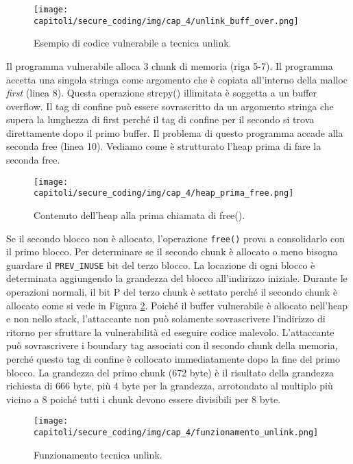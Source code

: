 \begin{figure}[H]
    \centering
    \texttt{[image: capitoli/secure\_coding/img/cap\_4/unlink\_buff\_over.png]}
    \caption{Esempio di codice vulnerabile a tecnica unlink.}\label{fig:ulink_buff_over}
\end{figure}

Il programma vulnerabile alloca 3 chunk di memoria (riga 5-7). Il programma accetta
una singola stringa come argomento che è copiata all'interno della malloc \textit{first} (linea 8).
Questa operazione strcpy() illimitata è soggetta a un buffer overflow.
Il tag di confine può essere sovrascritto da un argomento stringa che supera la
lunghezza di first perché il tag di confine per il secondo si trova direttamente dopo
il primo buffer. Il problema di questo programma accade alla seconda free (linea 10).
Vediamo come è strutturato l'heap prima di fare la seconda free.

\begin{figure}[H]
    \centering
    \texttt{[image: capitoli/secure\_coding/img/cap\_4/heap\_prima\_free.png]}
    \caption{Contenuto dell'heap alla prima chiamata di free().}\label{fig:heap_prima_free}
\end{figure}

\vspace{-1em}

Se il secondo blocco non è allocato, l'operazione \verb|free()| prova a consolidarlo
con il primo blocco. Per determinare se il secondo chunk è allocato o meno bisogna
guardare il \verb|PREV_INUSE| bit del terzo blocco. La locazione di ogni blocco è
determinata aggiungendo la grandezza del blocco all'indirizzo iniziale.
Durante le operazioni normali, il bit P del terzo chunk è settato perché il secondo
chunk è allocato come si vede in Figura \ref{fig:heap_prima_free}.
Poiché il buffer vulnerabile è allocato nell'heap e non nello stack, l'attaccante non
può solamente sovrascrivere l'indirizzo di ritorno per sfruttare la vulnerabilità ed
eseguire codice malevolo. L'attaccante può sovrascrivere i boundary tag associati
con il secondo chunk della memoria, perché questo tag di confine è collocato
immediatamente dopo la fine del primo blocco. La grandezza del primo chunk (672 byte)
è il risultato della grandezza richiesta di 666 byte, più 4 byte per la grandezza,
arrotondato al multiplo più vicino a 8 poiché tutti i chunk devono essere divisibili
per 8 byte.

\begin{figure}[H]
    \centering
    \texttt{[image: capitoli/secure\_coding/img/cap\_4/funzionamento\_unlink.png]}
    \caption{Funzionamento tecnica unlink.}\label{fig:funzionamento_unlink}
\end{figure}

